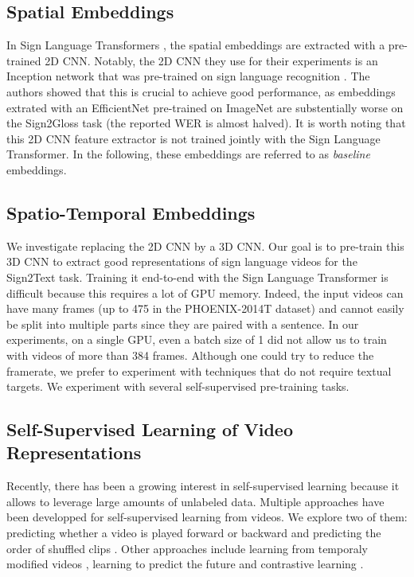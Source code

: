 \documentclass[final]{cvpr}
\begin{document}
\subsection{Spatial Embeddings}

In Sign Language Transformers \cite{neccam}, the spatial embeddings are extracted with a pre-trained 2D CNN. Notably, the 2D CNN they use for their experiments is an Inception network that was pre-trained on sign language recognition \cite{hmm}. The authors \cite{neccam} showed that this is crucial to achieve good performance, as embeddings extrated with an EfficientNet \cite{effnet} pre-trained on ImageNet are substentially worse on the Sign2Gloss task (the reported WER is almost halved).
It is worth noting that this 2D CNN feature extractor is not trained jointly with the Sign Language Transformer. In the following, these embeddings are referred to as \textit{baseline} embeddings.
\subsection{Spatio-Temporal Embeddings}
We investigate replacing the 2D CNN by a 3D CNN. Our goal is to pre-train this 3D CNN to extract good representations of sign language videos for the Sign2Text task. Training it end-to-end with the Sign Language Transformer is difficult because this requires a lot of GPU memory. Indeed, the input videos can have many frames (up to 475 in the PHOENIX-2014T \cite{phoenix} dataset) and cannot easily be split into multiple parts since they are paired with a sentence. In our experiments, on a single GPU, even a batch size of 1 did not allow us to train with videos of more than 384 frames. Although one could try to reduce the framerate, we prefer to experiment with techniques that do not require textual targets. We experiment with several self-supervised pre-training tasks.
\subsection{Self-Supervised Learning of Video Representations}
Recently, there has been a growing interest in self-supervised learning because it allows to leverage large amounts of unlabeled data. Multiple approaches have been developped for self-supervised learning from videos. We explore two of them: predicting whether a video is played forward or backward \cite{arrow} and predicting the order of shuffled clips \cite{vcop}. Other approaches include learning from temporaly modified videos \cite{playback-rate, pace, temp-trans}, learning to predict the future \cite{pred-coding} and contrastive learning \cite{contrast, bert-video}.
\end{document}

